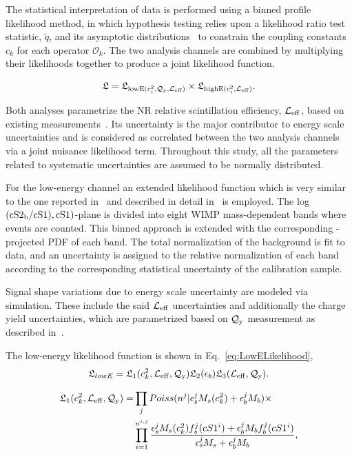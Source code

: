 The statistical interpretation of data is performed using a binned profile likelihood method, in which hypothesis testing relies upon a likelihood ratio test statistic, $\tilde{q}$, and its asymptotic distributions~\cite{asympt} to constrain the coupling constants $c_k$ for each operator $\mathcal{O}_k$. The two analysis channels are combined by multiplying their likelihoods together to produce a joint likelihood function.

\begin{equation}
\label{eq:FullLikelihood}
\mathfrak{L} = \mathfrak{L}_{\mathrm{lowE}(c_i^2,\mathcal{Q}_{\mathrm{y}},\mathcal{L}_{\mathrm{eff}})} \times \mathfrak{L}_{\mathrm{highE}(c_i^2,\mathcal{L}_{\mathrm{eff}})}  .
\end{equation}


Both analyses parametrize the NR relative scintillation efficiency, $\mathcal{L}_{\mathrm{eff}}$, based on existing measurements~\cite{run8Result}. Its uncertainty is the major contributor to energy scale uncertainties and is considered as correlated between the two analysis channels via a joint nuisance likelihood term.
Throughout this study, all the parameters related to systematic uncertainties are assumed to be normally distributed.

For the low-energy channel an extended likelihood function which is very similar to the one reported in~\cite{Aprile:2011hx} and described in detail in~\cite{xe100_run_combination} is employed. 
The log$(\mathrm{cS2}_\mathrm{b}/\mathrm{cS1}),\mathrm{cS1}{})$-plane is divided into eight WIMP mass-dependent bands where events are counted. This binned approach is extended with the corresponding \cSi{}-projected PDF of each band. The total normalization of the background is fit to data, and an uncertainty is assigned to the relative normalization of each band according to the corresponding statistical uncertainty of the calibration sample.

Signal shape variations due to energy scale uncertainty are modeled via simulation. These include  the said $\mathcal{L}_{\mathrm{eff}}$ uncertainties and additionally 
the charge yield uncertainties, which are parametrized based on $\mathcal{Q}_{\mathrm{y}}$ measurement as described in~\cite{DataMCXenon}.

The low-energy likelihood function is shown in Eq.~\ref{eq:LowELikelihood},  \begin{equation}
\label{eq:LowELikelihood}
\mathfrak{L}_{lowE} = \mathfrak{L}_1(c_k^2,\mathcal{L}_{\mathrm{eff}},\mathcal{Q}_{\mathrm{y}}) \mathfrak{L}_2(\epsilon_b) \mathfrak{L}_3(\mathcal{L}_{\mathrm{eff}},\mathcal{Q}_{\mathrm{y}}) .
\end{equation}

\begin{equation} \label{eq:LowELikelihood1}
\begin{split}
\mathfrak{L}_1(c_k^2,\mathcal{L}_{\mathrm{eff}},\mathcal{Q}_{\mathrm{y}}) = &\prod_j Poiss(n^j|\epsilon_s^jM_s(c_k^2)+\epsilon_b^jM_b) \times  \\
&\prod_{i=1}^{n^{i,j}} \frac{\epsilon_s^j M_s(c_k^2)f_s^j(cS1^i) + \epsilon_b^j M_bf_b^j(cS1^i)}{\epsilon^j_sM_s + \epsilon^j_bM_b} ,
\end{split}
\end{equation}

